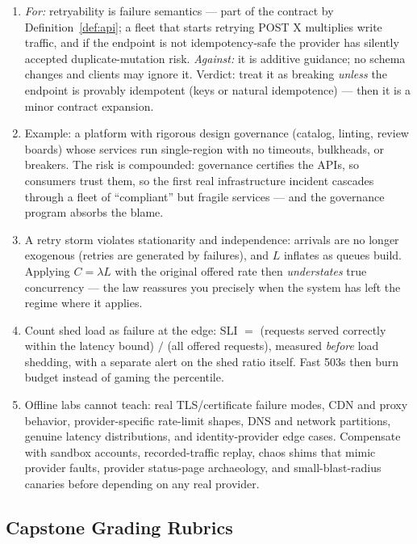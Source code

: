 \begin{enumerate}[label=\textbf{D0.\arabic*.}, leftmargin=3.2em]
  \item \emph{For:} retryability is failure semantics --- part of the
    contract by Definition~\ref{def:api}; a fleet that starts retrying POST X
    multiplies write traffic, and if the endpoint is not idempotency-safe the
    provider has silently accepted duplicate-mutation risk.
    \emph{Against:} it is additive guidance; no schema changes and clients
    may ignore it. Verdict: treat it as breaking \emph{unless} the endpoint
    is provably idempotent (keys or natural idempotence) --- then it is a
    minor contract expansion.
  \item Example: a platform with rigorous design governance (catalog,
    linting, review boards) whose services run single-region with no
    timeouts, bulkheads, or breakers. The risk is compounded: governance
    certifies the APIs, so consumers trust them, so the first real
    infrastructure incident cascades through a fleet of ``compliant'' but
    fragile services --- and the governance program absorbs the blame.
  \item A retry storm violates stationarity and independence: arrivals are
    no longer exogenous (retries are generated by failures), and $L$
    inflates as queues build. Applying $C=\lambda L$ with the original
    offered rate then \emph{understates} true concurrency --- the law
    reassures you precisely when the system has left the regime where it
    applies.
  \item Count shed load as failure at the edge: SLI $=$
    (requests served correctly within the latency bound) $/$
    (all offered requests), measured \emph{before} load shedding, with a
    separate alert on the shed ratio itself. Fast 503s then burn budget
    instead of gaming the percentile.
  \item Offline labs cannot teach: real TLS/certificate failure modes, CDN
    and proxy behavior, provider-specific rate-limit shapes, DNS and network
    partitions, genuine latency distributions, and identity-provider edge
    cases. Compensate with sandbox accounts, recorded-traffic replay, chaos
    shims that mimic provider faults, provider status-page archaeology, and
    small-blast-radius canaries before depending on any real provider.
\end{enumerate}

\subsection{Capstone Grading Rubrics}

